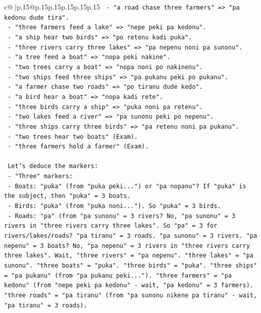 \documentclass{article}
\begin{document}
{\begin{supertabular}{c@{$\;$}|p{.15\linewidth}@{}p{.15\linewidth}p{.15\linewidth}p{.15\linewidth}p{.15\linewidth}p{.15\linewidth}}
{{{\texttt{                 {-} "a road chase three farmers" => "pa kedonu dude tira".} \\
\texttt{                 {-} "three farmers feed a lake" => "nepe peki pa kedonu".} \\
\texttt{                 {-} "a ship hear two birds" => "po retenu kadi puka".} \\
\texttt{                 {-} "three rivers carry three lakes" => "pa nepenu noni pa sunonu".} \\
\texttt{                 {-} "a tree feed a boat" => "nopa peki nakine".} \\
\texttt{                 {-} "two trees carry a boat" => "nopa noni po nakinenu".} \\
\texttt{                 {-} "two ships feed three ships" => "pa pukanu peki po pukanu".} \\
\texttt{                 {-} "a farmer chase two roads" => "po tiranu dude kedo".} \\
\texttt{                 {-} "a bird hear a boat" => "nopa kadi rete".} \\
\texttt{                 {-} "three birds carry a ship" => "puka noni pa retenu".} \\
\texttt{                 {-} "two lakes feed a river" => "pa sunonu peki po nepenu".} \\
\texttt{                 {-} "three ships carry three birds" => "pa retenu noni pa pukanu".} \\
\texttt{                 {-} "two trees hear two boats" (Exam).} \\
\texttt{                 {-} "three farmers hold a farmer" (Exam).} \\
\\ 
\texttt{                 Let's deduce the markers:} \\
\texttt{                 {-} "Three" markers:} \\
\texttt{                   {-} Boats: "puka" (from "puka peki...") or "pa nopanu"? If "puka" is the subject, then "puka" = 3 boats.} \\
\texttt{                   {-} Birds: "puka" (from "puka noni..."). So "puka" = 3 birds.} \\
\texttt{                   {-} Roads: "pa" (from "pa sunonu" = 3 rivers? No, "pa sunonu" = 3 rivers in "three rivers carry three lakes". So "pa" = 3 for rivers/lakes/roads? "pa tiranu" = 3 roads. "pa sunonu" = 3 rivers. "pa nepenu" = 3 boats? No, "pa nepenu" = 3 rivers in "three rivers carry three lakes". Wait, "three rivers" = "pa nepenu". "three lakes" = "pa sunonu". "three boats" = "puka". "three birds" = "puka". "three ships" = "pa pukanu" (from "pa pukanu peki..."). "three farmers" = "pa kedonu" (from "nepe peki pa kedonu" {-} wait, "pa kedonu" = 3 farmers). "three roads" = "pa tiranu" (from "pa sunonu nikene pa tiranu" {-} wait, "pa tiranu" = 3 roads).} \\
}}}
\end{supertabular}}
\end{document}
